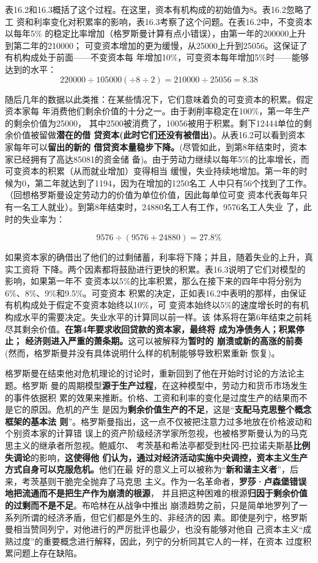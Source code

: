 


表16.2和16.3概括了这个过程。在这里，资本有机构成的初始值为8。表16.2忽略了工
资和利率变化对积累率的影响，表16.3考察了这个问题。在表16.2中，不变资本以每年5\%
的稳定比率增加（格罗斯曼计算有点小错误），由第一年的200000上升到第二年的210000；
可变资本增加的更为缓慢，从25000上升到25056。这保证了有机构成处于前面——不变资本每
年增加10\%，可变资本每年增加5\%时——能够达到的水平：
\[ 220000 \div 105000 (\div 8 \div 2) = 210000 \div 25056 = 8.38 \]

随后几年的数据以此类推：在某些情况下，它们意味着负的可变资本的积累。假定资本家每
年消费他们剩余价值的十分之一。由于剥削率稳定在100\%，第一年生产的剩余价值为25000，
其中2500被消费了，10056被用于积累。剩下12444单位的剩余价值被留做\textbf{潜在的借
贷资本(此时它们还没有被借出)}。从表16.2可以看到资本家每年可以\textbf{留出的新的
借贷资本量稳步下降。}(尽管如此，到第8年结束时，资本家已经拥有了高达85081的资金储
备)。由于劳动力继续以每年5\%的比率增长，而可变资本的积累（从而就业增加）变得相当
缓慢，失业持续地增加。第一年的时候为0，第二年就达到了1194，因为在增加的1250名工
人中只有56个找到了工作。（回想格罗斯曼设定劳动力的价值为单位价值，因此每单位可变
资本代表每年只有一名工人就业）。到第8年结束时，24880名工人有工作，9576名工人失业
了，此时的失业率为：

\[ 9576 \div (9576 + 24880) = 27.8\% \]

如果资本家的确借出了他们的过剩储蓄，利率将下降；并且，随着失业的上升，真实工资将
下降。两个因素都将鼓励进行更快的积累。表16.3说明了它们对模型的影响，如果第一年不
变资本以5\%的比率积累，那么在接下来的四年中将分别为6\%、8\%、9\%和9.5\%。可变资本
积累的决定，正如表16.2中表明的那样，由保证有机构成处于假定不变资本始终以10\%，可
变资本始终以5\%的速度增长时的有机构成水平的需要决定。失业水平的计算同以前一样。该
体系将在第6年结束之前耗尽其剩余价值。\textbf{在第4年要求收回贷款的资本家，最终将
  成为净债务人；积累停止； 经济则进入严重的萧条期。}这可以被解释为\textbf{暂时的
  崩溃或新的高涨的前奏} (然而，格罗斯曼并没有具体说明什么样的机制能够导致积累重新
恢复)。

格罗斯曼在结束他对危机理论的讨论时，重新回到了他在开始时讨论的方法论主题。格罗斯
曼的周期模型\textbf{源于生产过程}，在这种模型中，劳动力和货币市场发生的事件依据积
累的效果来推断。价格、工资和利率的变化是过度生产的结果而不是它的原因。危机的产生
是因为\textbf{剩余价值生产的不足}，这是“\textbf{支配马克思整个概念框架的基本法
  则}”。格罗斯曼指出，这一点不仅被把注意力过多地放在价格波动和个别资本家的计算错
误上的资产阶级经济学家所忽视，也被格罗斯曼认为的马克思主义的继承者所忽视。鲍威尔、
考茨基和希法亭都受到杜冈-巴拉诺夫斯基\textbf{比例失调论}的影响，\textbf{这使得他
  们认为，通过对经济活动实施中央调控，资本主义生产方式自身可以克服危机。}他们在最
好的意义上可以被称为“\textbf{新和谐主义者}”，后来，考茨基则干脆完全抛弃了马克思
主义。作为一名革命者，\textbf{罗莎·卢森堡错误地把流通而不是把生产作为崩溃的根源}，
并且把这种困难的根源\textbf{归因于剩余价值的过剩而不是不足}。布哈林在从战争中推出
崩溃趋势之前，只是简单地罗列了一系列所谓的经济矛盾，但它们都是外生的、非经济的因
素。即使是列宁，格罗斯曼相当赞同列宁，对他进行的严厉批评也最少，也没有能够对他自
己资本主义“成熟过度”的重要概念进行解释，因此，列宁的分析同其它人的一样，在资本
过度积累问题上存在缺陷。


